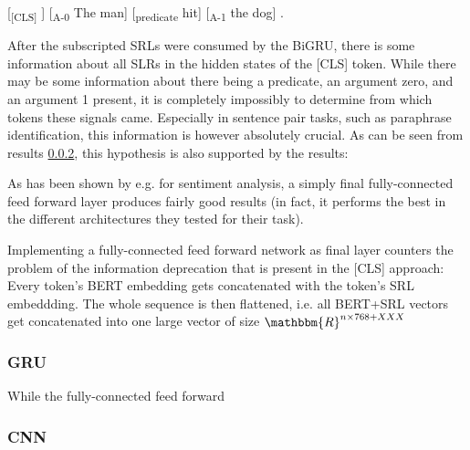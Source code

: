 [\textsubscript{[CLS]} ] [\textsubscript{A-0} The man] [\textsubscript{predicate} hit] [\textsubscript{A-1} the dog] .

After the subscripted SRLs were consumed by the BiGRU, there is some information about all SLRs in the hidden states of the [CLS] token.
While there may be some information about there being a predicate, an argument zero, and an argument 1 present, it is completely impossibly to determine from which tokens these signals came.
Especially in sentence pair tasks, such as paraphrase identification, this information is however absolutely crucial.
As can be seen from results \ref{}, this hypothesis is also supported by the results:


As has been shown by e.g. \cite{myagmar2019transferable} for sentiment analysis, a simply final fully-connected feed forward layer produces fairly good results (in fact, it performs the best in the different architectures they tested for their task).

Implementing a fully-connected feed forward network as final layer counters the problem of the information deprecation that is present in the [CLS] approach:
Every token's BERT embedding gets concatenated with the token's SRL embeddding.
The whole sequence is then flattened, i.e. all BERT+SRL vectors get concatenated into one large vector of size $\mathbbm{R}^{n\times768+XXX}$

\subsubsection{GRU}

While the fully-connected feed forward 
\subsubsection{CNN}


